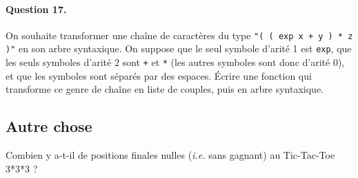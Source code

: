 \documentclass[10pt,a4paper]{article}
\begin{document}
\paragraph{Question 17.} On souhaite transformer une chaîne de caractères du type 
\texttt{"( ( exp x + y ) * z )"} en son arbre syntaxique. On suppose que le seul 
symbole d'arité 1 est \texttt{exp}, que les seuls symboles d'arité 2 sont \texttt{+} 
et \texttt{*} (les autres symboles sont donc d'arité 0), et que les symboles sont séparés 
par des espaces. Écrire une fonction qui transforme ce genre de chaîne en liste de 
couples, puis en arbre syntaxique.
\subsection{Autre chose}
Combien y a-t-il de positions finales nulles (\textit{i.e.} sans gagnant) au Tic-Tac-Toe 3*3*3 ?
\end{document}
